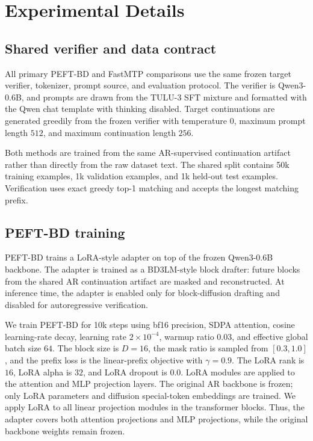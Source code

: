 \documentclass[11pt]{article}
\begin{document}
%



\appendix

\section{Experimental Details}

\subsection{Shared verifier and data contract}

All primary PEFT-BD and FastMTP comparisons use the same frozen target verifier, tokenizer, prompt source, and evaluation protocol. The verifier is Qwen3-0.6B, and prompts are drawn from the TULU-3 SFT mixture and formatted with the Qwen chat template with thinking disabled. Target continuations are generated greedily from the frozen verifier with temperature $0$, maximum prompt length $512$, and maximum continuation length $256$.

Both methods are trained from the same AR-supervised continuation artifact rather than directly from the raw dataset text. The shared split contains 50k training examples, 1k validation examples, and 1k held-out test examples. Verification uses exact greedy top-1 matching and accepts the longest matching prefix.

\subsection{PEFT-BD training}

PEFT-BD trains a LoRA-style adapter on top of the frozen Qwen3-0.6B backbone. The adapter is trained as a BD3LM-style block drafter: future blocks from the shared AR continuation artifact are masked and reconstructed. At inference time, the adapter is enabled only for block-diffusion drafting and disabled for autoregressive verification.

We train PEFT-BD for 10k steps using bf16 precision, SDPA attention, cosine learning-rate decay, learning rate $2\times 10^{-4}$, warmup ratio $0.03$, and effective global batch size $64$. The block size is $D=16$, the mask ratio is sampled from $[0.3,1.0]$, and the prefix loss is the linear-prefix objective with $\gamma=0.9$. The LoRA rank is $16$, LoRA alpha is $32$, and LoRA dropout is $0.0$. LoRA modules are applied to the attention and MLP projection layers. The original AR backbone is frozen; only LoRA parameters and diffusion special-token embeddings are trained.
We apply LoRA to all linear projection modules in the transformer blocks. Thus, the adapter covers both attention projections and MLP projections, while the original backbone weights remain frozen.
\end{document}
